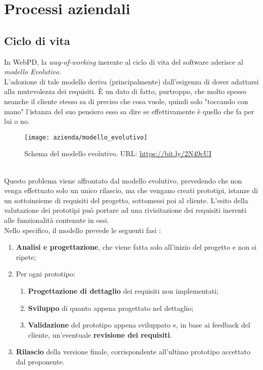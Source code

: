 \section{Processi aziendali}
\subsection{Ciclo di vita}
In WebPD, la \textit{way-of-working} inerente al ciclo di vita del software aderisce al \textit{modello Evolutivo}.\\
L'adozione di tale modello deriva (principalmente) dall'esigenza di dover adattarsi alla mutevolezza dei requisiti. È un dato di fatto, purtroppo, che molto spesso neanche il cliente stesso sa di preciso che cosa vuole, quindi solo "toccando con mano" l'istanza del suo pensiero esso sa dire se effettivamente è quello che fa per lui o no.\\
\begin{figure}[!h] 
	\centering 
	\texttt{[image: azienda/modello\_evolutivo]} 
	\caption{Schema del modello evolutivo. URL: \url{https://bit.ly/2N49cUI} }
\end{figure}\\
Questo problema viene affrontato dal modello evolutivo, prevedendo che non venga effettuato solo un unico rilascio, ma che vengano creati prototipi, istanze di un sottoinsieme di requisiti del progetto, sottomessi poi al cliente. L'esito della valutazione dei prototipi può portare ad una rivisitazione dei requisiti inerenti alle funzionalità contenute in essi.\\
Nello specifico, il modello prevede le seguenti fasi :
\begin{enumerate}
	\item \textbf{Analisi e progettazione}, che viene fatta solo all'inizio del progetto e non si ripete;
	\item Per ogni prototipo:
		\begin{enumerate}
			\item \textbf{Progettazione di dettaglio} dei requisiti non implementati;
			\item \textbf{Sviluppo} di quanto appena progettato nel dettaglio;
			\item \textbf{Validazione} del prototipo appena sviluppato e, in base ai feedback del cliente, un'eventuale \textbf{revisione dei requisiti}.
		\end{enumerate}
	\item \textbf{Rilascio} della versione finale, corrispondente all'ultimo prototipo accettato dal proponente.
\end{enumerate}
